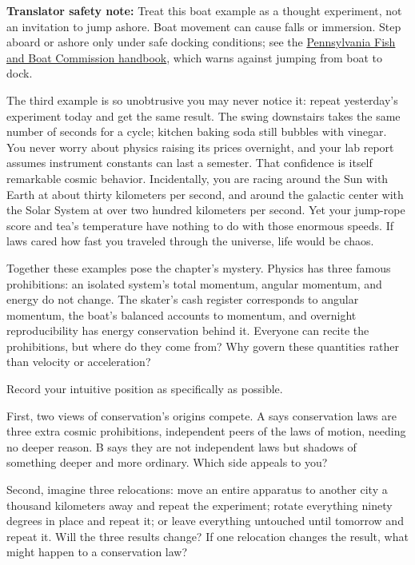 \textbf{Translator safety note:} Treat this boat example as a thought experiment, not an invitation to jump ashore. Boat movement can cause falls or immersion. Step aboard or ashore only under safe docking conditions; see the \href{https://pfbc.pa.gov/fishpub/summaryad2022/2022summarybook.pdf}{Pennsylvania Fish and Boat Commission handbook}, which warns against jumping from boat to dock.

The third example is so unobtrusive you may never notice it: repeat yesterday's experiment today and get the same result. The swing downstairs takes the same number of seconds for a cycle; kitchen baking soda still bubbles with vinegar. You never worry about physics raising its prices overnight, and your lab report assumes instrument constants can last a semester. That confidence is itself remarkable cosmic behavior. Incidentally, you are racing around the Sun with Earth at about thirty kilometers per second, and around the galactic center with the Solar System at over two hundred kilometers per second. Yet your jump-rope score and tea's temperature have nothing to do with those enormous speeds. If laws cared how fast you traveled through the universe, life would be chaos.

Together these examples pose the chapter's mystery. Physics has three famous prohibitions: an isolated system's total momentum, angular momentum, and energy do not change. The skater's cash register corresponds to angular momentum, the boat's balanced accounts to momentum, and overnight reproducibility has energy conservation behind it. Everyone can recite the prohibitions, but where do they come from? Why govern these quantities rather than velocity or acceleration?


Record your intuitive position as specifically as possible.

First, two views of conservation's origins compete. A says conservation laws are three extra cosmic prohibitions, independent peers of the laws of motion, needing no deeper reason. B says they are not independent laws but shadows of something deeper and more ordinary. Which side appeals to you?

Second, imagine three relocations: move an entire apparatus to another city a thousand kilometers away and repeat the experiment; rotate everything ninety degrees in place and repeat it; or leave everything untouched until tomorrow and repeat it. Will the three results change? If one relocation changes the result, what might happen to a conservation law?

